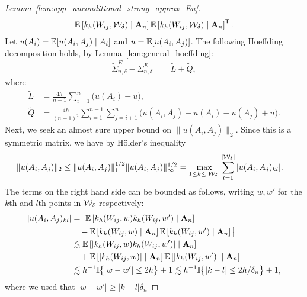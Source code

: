 \begin{proof}[Lemma~\ref{lem:app_unconditional_strong_approx_En}]
\begin{align*}
    \mathbb{E}\left[
      k_h(W_{i j}, \mathcal{W}_\delta)
      \mid \mathbf{A}_n
    \right]
    \mathbb{E}\left[
      k_h(W_{i j}, \mathcal{W}_\delta)
      \mid \mathbf{A}_n
    \right]^{\mathsf{T}}.
  \end{align*}
  Let $u(A_i) = \mathbb{E}[u(A_i, A_j) \mid A_i]$
  and
  $u = \mathbb{E}[u(A_i, A_j)]$.
  The following Hoeffding decomposition holds,
  by Lemma~\ref{lem:general_hoeffding}:
  \begin{align*}
    \tilde \Sigma^E_{n,\delta} - \Sigma^E_{n,\delta}
    &=
    \tilde L +\tilde Q,
  \end{align*}
  where
  \begin{align*}
    \tilde L
    &=
    \frac{4h}{n-1}
    \sum_{i=1}^n
    \big(
      u(A_i) - u
    \big), \\
    \tilde Q
    &=
    \frac{4h}{(n-1)^2}
    \sum_{i=1}^{n-1}
    \sum_{j=i+1}^{n}
    \big(
      u(A_i, A_j) - u(A_i) - u(A_j) + u
    \big).
  \end{align*}
  Next, we seek an almost sure upper bound on
  $\|u(A_i, A_j)\|_2$.
  Since this is a symmetric matrix,
  we have by H{\"o}lder's inequality
  \begin{align*}
    \|u(A_i, A_j)\|_2
    &\leq
    \|u(A_i, A_j)\|_1^{1/2}
    \|u(A_i, A_j)\|_\infty^{1/2}
    =
    \max_{1 \leq k \leq |\mathcal{W}_\delta|}
    \sum_{l=1}^{|\mathcal{W}_\delta|}
    |u(A_i, A_j)_{kl}|.
  \end{align*}
  The terms on the right hand side can be bounded as follows,
  writing $w, w'$ for the $k$th and $l$th
  points in $\mathcal{W}_\delta$ respectively:
  \begin{align*}
    |u(A_i, A_j)_{kl}|
    &=
    \big|
    \mathbb{E}\left[
      k_h(W_{i j}, w)
      k_h(W_{i j}, w')
      \mid \mathbf{A}_n
    \right] \\
    &\quad-
    \mathbb{E}\left[
      k_h(W_{i j}, w)
      \mid \mathbf{A}_n
    \right]
    \mathbb{E}\left[
      k_h(W_{i j}, w')
      \mid \mathbf{A}_n
    \right]
    \big| \\
    &\lesssim
    \mathbb{E}\left[
      |
      k_h(W_{i j}, w)
      k_h(W_{i j}, w')
      |
      \mid \mathbf{A}_n
    \right] \\
    &\quad+
    \mathbb{E}\left[
      |
      k_h(W_{i j}, w)
      |
      \mid \mathbf{A}_n
    \right]
    \mathbb{E}\left[
      |
      k_h(W_{i j}, w')
      |
      \mid \mathbf{A}_n
    \right] \\
    &\lesssim
    h^{-1}
    \mathbb{I}\big\{ |w-w'| \leq 2h \big\}
    + 1
    \lesssim
    h^{-1}
    \mathbb{I}\big\{ |k-l| \leq 2h/\delta_n \big\}
    + 1,
  \end{align*}
  where we used that
  $|w-w'| \geq |k-l| \delta_n$

\end{proof}
